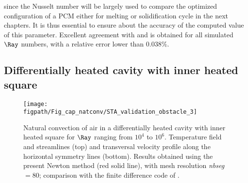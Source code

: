 since the Nusselt number will be largely used to compare the optimized configuration of a PCM either for melting or solidification cycle in the next chapters.
It is thus essential to ensure about the accuracy of the computed value of this parameter.
Excellent agreement with \cite{de1983natural} and \cite{LeQuere91} is obtained for all simulated $\Ray$ numbers, with a relative error lower than $0.038 \%$.
%         


\subsection{Differentially heated cavity with inner heated square} \label{sub-2D-OBSTACLE}

\begin{figure}
	\begin{center}
		\texttt{[image: \\figpath/Fig\_cap\_natconv/STA\_validation\_obstacle\_3]} 
	\end{center}
	\caption{Natural convection of air in a differentially heated cavity with inner heated square for $\Ray$ ranging from $10^4$ to $10^6$. Temperature field and streamlines (top) and transversal velocity profile along the  horizontal symmetry lines (bottom). Results obtained using the present Newton method (red solid line), with mesh resolution {\em nbseg} $=80$; comparison with the finite difference code of \cite{Raluca2013}.}
	\label{fig-obst-2D}
\end{figure}

